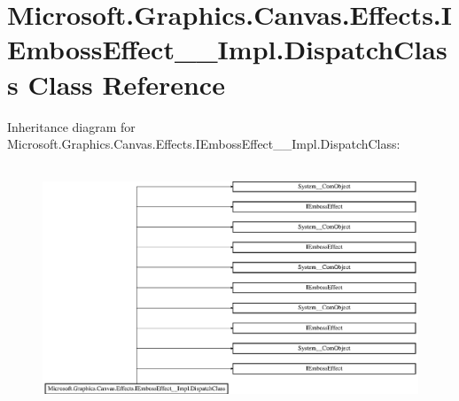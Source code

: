 \hypertarget{class_microsoft_1_1_graphics_1_1_canvas_1_1_effects_1_1_i_emboss_effect_____impl_1_1_dispatch_class}{}\section{Microsoft.\+Graphics.\+Canvas.\+Effects.\+I\+Emboss\+Effect\+\_\+\+\_\+\+Impl.\+Dispatch\+Class Class Reference}
\label{class_microsoft_1_1_graphics_1_1_canvas_1_1_effects_1_1_i_emboss_effect_____impl_1_1_dispatch_class}
Inheritance diagram for Microsoft.\+Graphics.\+Canvas.\+Effects.\+I\+Emboss\+Effect\+\_\+\+\_\+\+Impl.\+Dispatch\+Class\+:\begin{figure}[H]
\begin{center}
\leavevmode
\includegraphics[height=7.315915cm]{class_microsoft_1_1_graphics_1_1_canvas_1_1_effects_1_1_i_emboss_effect_____impl_1_1_dispatch_class}
\end{center}
\end{figure}
